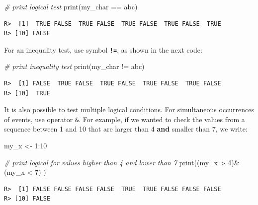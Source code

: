 \documentclass[
  12pt,
]{book}
\newenvironment{Shaded}{\begin{snugshade}}{\end{snugshade}}
\newcommand{\CommentTok}[1]{\textcolor[rgb]{0.37,0.37,0.37}{\textit{#1}}}
\newcommand{\DecValTok}[1]{\textcolor[rgb]{0.06,0.06,0.06}{#1}}
\newcommand{\FunctionTok}[1]{\textcolor[rgb]{0,0,0}{#1}}
\newcommand{\NormalTok}[1]{#1}
\newcommand{\OtherTok}[1]{\textcolor[rgb]{0.37,0.37,0.37}{#1}}
\newcommand{\SpecialCharTok}[1]{\textcolor[rgb]{0,0,0}{#1}}
\newcommand{\StringTok}[1]{\textcolor[rgb]{0.5,0.5,0.5}{#1}}
\begin{document}
\begin{Shaded}
\begin{Highlighting}[]
\CommentTok{\# print logical test}
\FunctionTok{print}\NormalTok{(my\_char }\SpecialCharTok{==} \StringTok{\textquotesingle{}abc\textquotesingle{}}\NormalTok{)}
\end{Highlighting}
\end{Shaded}

\begin{verbatim}
R>  [1]  TRUE FALSE  TRUE FALSE  TRUE FALSE  TRUE FALSE  TRUE
R> [10] FALSE
\end{verbatim}

For an inequality test, use symbol \textbf{\texttt{!=}}, as shown in the next code: 

\begin{Shaded}
\begin{Highlighting}[]
\CommentTok{\# print inequality test}
\FunctionTok{print}\NormalTok{(my\_char }\SpecialCharTok{!=} \StringTok{\textquotesingle{}abc\textquotesingle{}}\NormalTok{)}
\end{Highlighting}
\end{Shaded}

\begin{verbatim}
R>  [1] FALSE  TRUE FALSE  TRUE FALSE  TRUE FALSE  TRUE FALSE
R> [10]  TRUE
\end{verbatim}

It is also possible to test multiple logical conditions. For simultaneous occurrences of events, use operator \texttt{\&}. For example, if we wanted to check the values from a sequence between 1 and 10 that are larger than 4 \textbf{and} smaller than 7, we write: 

\begin{Shaded}
\begin{Highlighting}[]
\NormalTok{my\_x }\OtherTok{\textless{}{-}} \DecValTok{1}\SpecialCharTok{:}\DecValTok{10}

\CommentTok{\# print logical for values higher than 4 and lower than 7}
\FunctionTok{print}\NormalTok{((my\_x }\SpecialCharTok{\textgreater{}} \DecValTok{4}\NormalTok{)}\SpecialCharTok{\&}\NormalTok{(my\_x }\SpecialCharTok{\textless{}} \DecValTok{7}\NormalTok{) )}
\end{Highlighting}
\end{Shaded}

\begin{verbatim}
R>  [1] FALSE FALSE FALSE FALSE  TRUE  TRUE FALSE FALSE FALSE
R> [10] FALSE
\end{verbatim}
\end{document}
